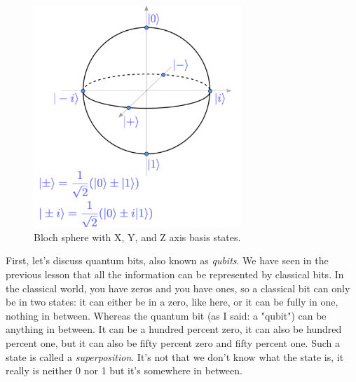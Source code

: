 \begin{figure}[H]
    \centering
    \includegraphics[width=0.7\textwidth]{lesson2/bloch_sphere_annotated.pdf}
    
        \caption{Bloch sphere with X, Y, and Z axis basis states.}
    
    \label{fig:annotated-bloch}
\end{figure}


First, let's discuss quantum bits, also known as \emph{qubits}. We have seen in the previous lesson that all the information can be represented by classical bits. In the classical world, you have zeros and you have ones, so a classical bit can only be in two states: it can either be in a zero, like here, or it can be fully in one, nothing in between. Whereas the quantum bit (as I said: a "qubit") can be anything in between. It can be a hundred percent zero, it can also be hundred percent one, but it can also be fifty percent zero and fifty percent one. Such a state is called a \emph{superposition}. It's not that we don't know what the state is, it really is neither 0 nor 1 but it's somewhere in between.

